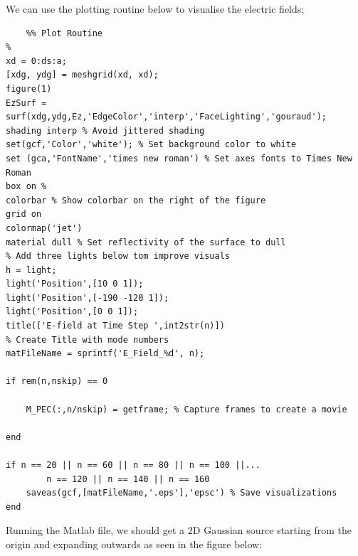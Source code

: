 \documentclass[12pt]{article}
\begin{document}
\normalsize
We can use the plotting routine below to visualise the electric fields:
\begin{mdframed}[backgroundcolor=gray!20]
  \scriptsize
  \begin{verbatim}
    %% Plot Routine
%
xd = 0:ds:a;
[xdg, ydg] = meshgrid(xd, xd);
figure(1)
EzSurf = surf(xdg,ydg,Ez,'EdgeColor','interp','FaceLighting','gouraud');
shading interp % Avoid jittered shading
set(gcf,'Color','white'); % Set background color to white
set (gca,'FontName','times new roman') % Set axes fonts to Times New Roman
box on %
colorbar % Show colorbar on the right of the figure
grid on
colormap('jet')
material dull % Set reflectivity of the surface to dull
% Add three lights below tom improve visuals
h = light;
light('Position',[10 0 1]);
light('Position',[-190 -120 1]);
light('Position',[0 0 1]);
title(['E-field at Time Step ',int2str(n)])
% Create Title with mode numbers
matFileName = sprintf('E_Field_%d', n);

if rem(n,nskip) == 0
    
    M_PEC(:,n/nskip) = getframe; % Capture frames to create a movie
    
end

if n == 20 || n == 60 || n == 80 || n == 100 ||...
        n == 120 || n == 140 || n == 160
    saveas(gcf,[matFileName,'.eps'],'epsc') % Save visualizations
end
  \end{verbatim}
\end{mdframed}

Running the Matlab file, we should get a 2D Gaussian source starting from the origin and expanding outwards as seen in the figure below:
\end{document}
